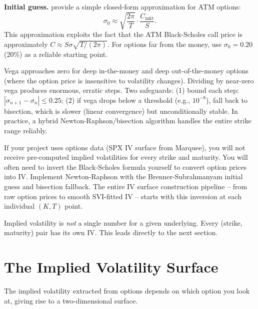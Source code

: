 \textbf{Initial guess.}
\citet{BrennerSubrahmanyam1988} provide a simple closed-form approximation for ATM options:
\begin{equation}\label{eq:bs-approx}
\sigma_0 \approx \sqrt{\frac{2\pi}{T}} \cdot \frac{C_{\text{mkt}}}{S}.
\end{equation}
This approximation exploits the fact that the ATM Black-Scholes call price is approximately $C \approx S\sigma\sqrt{T/(2\pi)}$.
For options far from the money, use $\sigma_0 = 0.20$ (20\%) as a reliable starting point.

\begin{warning}
Vega approaches zero for deep in-the-money and deep out-of-the-money options (where the option price is insensitive to volatility changes).
Dividing by near-zero vega produces enormous, erratic steps.
Two safeguards:
(1) bound each step: $|\sigma_{n+1} - \sigma_n| \leq 0.25$;
(2) if vega drops below a threshold (e.g., $10^{-8}$), fall back to bisection, which is slower (linear convergence) but unconditionally stable.
In practice, a hybrid Newton-Raphson/bisection algorithm handles the entire strike range reliably.
\end{warning}

\begin{projectconnection}
If your project uses options data (SPX IV surface from Marquee), you will not receive pre-computed implied volatilities for every strike and maturity.
You will often need to invert the Black-Scholes formula yourself to convert option prices into IV.
Implement Newton-Raphson with the Brenner-Subrahmanyam initial guess and bisection fallback.
The entire IV surface construction pipeline -- from raw option prices to smooth SVI-fitted IV -- starts with this inversion at each individual $(K, T)$ point.
\end{projectconnection}

Implied volatility is \emph{not} a single number for a given underlying.
Every (strike, maturity) pair has its own IV.
This leads directly to the next section.


\section{The Implied Volatility Surface}
\label{sec:iv-surface}

The implied volatility extracted from options depends on which option you look at, giving rise to a two-dimensional surface.


